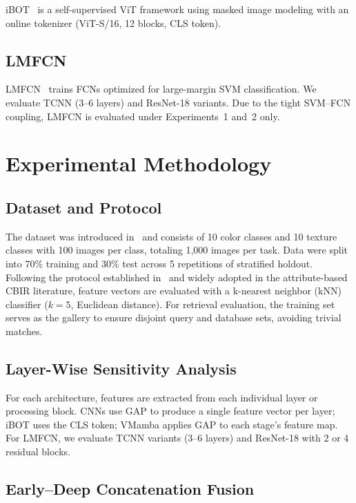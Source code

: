 \documentclass[conference]{IEEEtran}
\begin{document}
iBOT~\cite{b17} is a self-supervised ViT framework using masked image
modeling with an online tokenizer (ViT-S/16, 12 blocks, CLS token).

\subsection{LMFCN}

LMFCN~\cite{b28} trains FCNs optimized for large-margin SVM classification.
We evaluate TCNN (3--6 layers) and ResNet-18 variants.
Due to the tight SVM--FCN coupling, LMFCN is evaluated under
Experiments~1 and~2 only.

\section{Experimental Methodology}

\subsection{Dataset and Protocol}

The dataset was introduced in~\cite{b2} and consists of 10 color classes
and 10 texture classes with 100 images per class, totaling 1,000 images
per task.
Data were split into 70\% training and 30\% test across 5 repetitions of
stratified holdout.
Following the protocol established in~\cite{b2} and widely adopted in the
attribute-based CBIR literature, feature vectors are evaluated with a
k-nearest neighbor (kNN) classifier ($k=5$, Euclidean distance).
For retrieval evaluation, the training set serves as the gallery to ensure
disjoint query and database sets, avoiding trivial matches.

\subsection{Layer-Wise Sensitivity Analysis}

For each architecture, features are extracted from each individual layer
or processing block.
CNNs use GAP to produce a single feature vector per layer; iBOT uses the
CLS token; VMamba applies GAP to each stage's feature map.
For LMFCN, we evaluate TCNN variants (3--6 layers) and ResNet-18 with 2 or
4 residual blocks.

\subsection{Early--Deep Concatenation Fusion}
\end{document}
